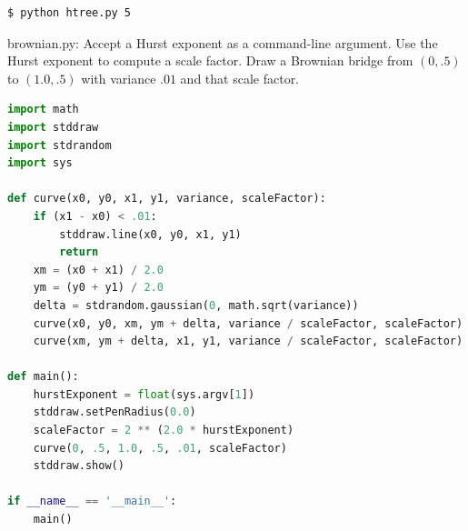 \documentclass[8pt,a4paper,compress]{beamer}
\begin{document}
\begin{frame}[fragile]
\begin{minipage}{160pt}
\begin{lstlisting}[language={}]
$ python htree.py 5
\end{lstlisting}
\end{minipage}%
\begin{minipage}{140pt}
\hfill {}
\end{minipage}
\end{frame}

\begin{frame}[fragile]
\pause

\begin{framed}
\tiny brownian.py: Accept a Hurst exponent as a command-line argument. Use the Hurst exponent to compute a scale factor. Draw a Brownian bridge from $(0, .5)$ to $(1.0, .5)$ with variance $.01$ and that scale factor.
\end{framed}

\begin{lstlisting}[language=Python]
import math
import stddraw
import stdrandom
import sys

def curve(x0, y0, x1, y1, variance, scaleFactor):
    if (x1 - x0) < .01:
        stddraw.line(x0, y0, x1, y1)
        return
    xm = (x0 + x1) / 2.0
    ym = (y0 + y1) / 2.0
    delta = stdrandom.gaussian(0, math.sqrt(variance))
    curve(x0, y0, xm, ym + delta, variance / scaleFactor, scaleFactor)
    curve(xm, ym + delta, x1, y1, variance / scaleFactor, scaleFactor)

def main():
    hurstExponent = float(sys.argv[1])
    stddraw.setPenRadius(0.0)
    scaleFactor = 2 ** (2.0 * hurstExponent)
    curve(0, .5, 1.0, .5, .01, scaleFactor)
    stddraw.show()

if __name__ == '__main__':
    main()
\end{lstlisting}
\end{frame}
\end{document}
